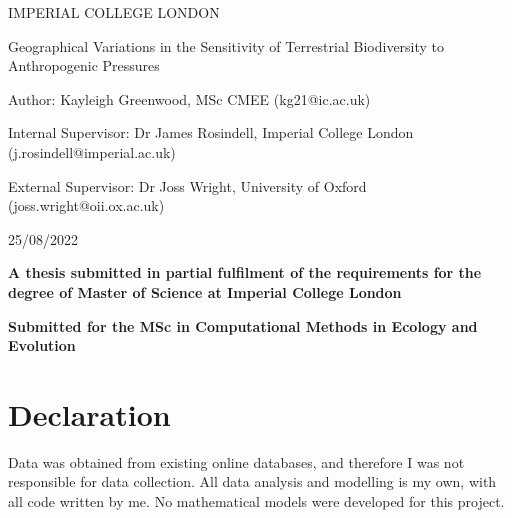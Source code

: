 \documentclass[11pt, a4paper, titlepage]{article}
\begin{document}
    \begin{titlepage}
    \begin{center}
            {\large IMPERIAL COLLEGE LONDON}
    \end{center}
    
    \vspace*{\fill}
    
    \begin{center}
        {\Huge 
    	 Geographical Variations in the Sensitivity of Terrestrial Biodiversity to Anthropogenic Pressures}
        \\[2in]
        \begin{center}
        Author: Kayleigh Greenwood, MSc CMEE (kg21@ic.ac.uk)
        \end{center}
        \bigskip

       Internal Supervisor: Dr James Rosindell, Imperial College London (j.rosindell@imperial.ac.uk)
       \bigskip

       \begin{center}
        External Supervisor: Dr Joss Wright, University of Oxford (joss.wright@oii.ox.ac.uk)
       \end{center}
        \bigskip



        25/08/2022
        \\[2in]
        \begin{center}
        {\bfseries A thesis submitted in partial fulfilment of the requirements for the degree of Master of Science at Imperial College London}
        \end{center}
    
        \begin{center}
        {\bfseries Submitted for the MSc in Computational Methods in Ecology and Evolution }
        \end{center}
        

    
	\end{center}
    \vspace{\fill}
    
    \end{titlepage}
	\section*{Declaration}

	Data was obtained from existing online databases, and therefore I was not responsible for data collection. All data analysis and modelling is my own, with all code written by me. No mathematical models were developed for this project.
\end{document}
